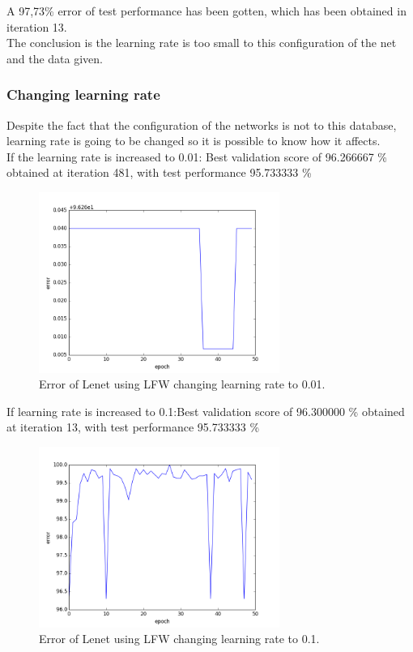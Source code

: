 A 97,73\% error of test performance has been gotten, which has been obtained in iteration 13. \\

The conclusion is the learning rate is too small to this configuration of the net and the data given.\\

\subsubsection{Changing learning rate}
Despite the fact that the configuration of the networks is not to this database, learning rate is going to be changed so it is possible to know how it affects.\\

If the learning rate is increased to 0.01: Best validation score of 96.266667 \% obtained at iteration 481, with test performance 95.733333 \%\\

\begin{figure}[htb]
\centering
\includegraphics[width=0.7\textwidth]{images/LFW_learningrate/error_0_01.png}
\caption{Error of Lenet using LFW changing learning rate to 0.01.} \label{fig:LENETLFW_lr0_01}
\end{figure}

If learning rate is increased to 0.1:Best validation score of 96.300000 \% obtained at iteration 13, with test performance 95.733333 \%\\

\begin{figure}[htb]
\centering
\includegraphics[width=0.7\textwidth]{images/LFW_learningrate/error_0_1.png}
\caption{Error of Lenet using LFW changing learning rate to 0.1.} \label{fig:LENETLFW_lr0_1}
\end{figure}

